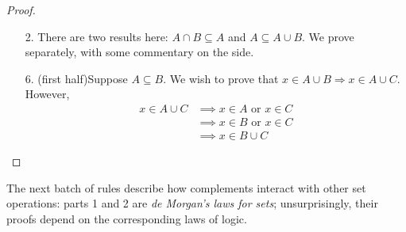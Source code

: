 \begin{proof}
\begin{enumerate}
  \item[2.] There are two results here: $A\cap B\subseteq A$ and $A\subseteq A\cup B$. We prove separately, with some commentary on the side.
	
	\goodbreak
	
	\item[6.] (first half)\lstsp Suppose $A\subseteq B$. We wish to prove that $x\in A\cup B\Longrightarrow x\in A\cup C$. However,
	\begin{align*}
		x\in A\cup C&\implies x\in A\text{ or }x\in C\tag{definition of union}\\
		&\implies x\in B\text{ or }x\in C\tag{since $A\subseteq B$}\\
		&\implies x\in B\cup C \tag*{\qedhere}
	\end{align*}
\end{enumerate}
\end{proof}



The next batch of rules describe how complements interact with other set operations: parts 1 and 2 are \emph{de Morgan's laws for sets}; unsurprisingly, their proofs depend on the corresponding laws of logic.


